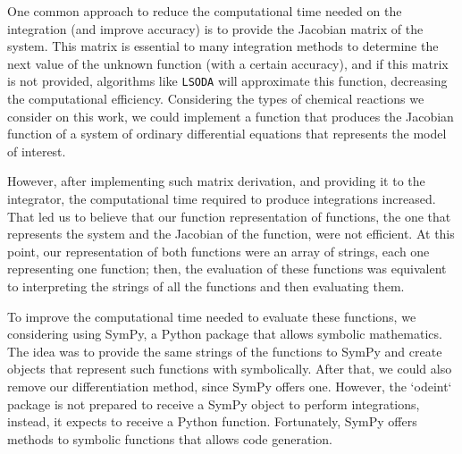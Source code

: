 

One common approach to reduce the computational time needed on the
integration (and improve accuracy) is to provide the Jacobian matrix of
the system. This matrix is essential to many integration methods to
determine the next value of the unknown function (with a certain
accuracy), and if this matrix is not provided, algorithms like 
{\tt LSODA} will approximate this function, decreasing the computational 
efficiency. Considering the types of chemical reactions we consider on
this work, we could implement a function that produces the Jacobian
function of a system of ordinary differential equations that represents
the model of interest.

However, after implementing such matrix derivation, and providing it to
the integrator, the computational time required to produce integrations
increased. That led us to believe that our function representation of
functions, the one that represents the system and the Jacobian of the
function, were not efficient. At this point, our representation of both
functions were an array of strings, each one representing one function;
then, the evaluation of these functions was equivalent to interpreting
the strings of all the functions and then evaluating them.

To improve the computational time needed to evaluate these functions, we
considering using SymPy, a Python package that allows symbolic
mathematics. The idea was to provide the same strings of the functions
to SymPy and create objects that represent such functions with
symbolically. After that, we could also remove our differentiation
method, since SymPy offers one. However, the `odeint` package is not
prepared to receive a SymPy object to perform integrations, instead, it
expects to receive a Python function. Fortunately, SymPy offers methods
to symbolic functions that allows code generation.

